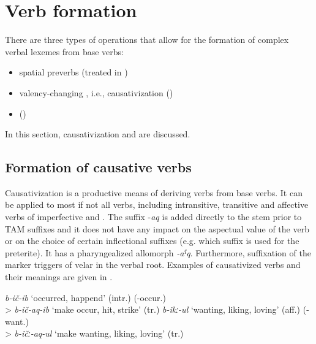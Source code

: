 \chapter{Verb formation}
\label{cpt:verbformation}

There are three types of operations that allow for the formation of complex verbal lexemes from base verbs:

\begin{itemize}
	\item	spatial preverbs (treated in )
	\item	valency-changing , i.e., causativization ()
	\item	{} ()
\end{itemize}

In this section, causativization and  are discussed. 



\section{Formation of causative verbs}
\label{sec:Formation of causative verbs}
Causativization is a productive means of deriving  verbs from base verbs. It can be applied to most if not all verbs, including intransitive, transitive and affective verbs of imperfective and . The  suffix -\textit{aq} is added directly to the stem prior to TAM suffixes and it does not have any impact on the aspectual value of the verb or on the choice of certain inflectional suffixes (e.g. which suffix is used for the preterite). It has a pharyngealized allomorph \textit{-aˁq}. Furthermore, suffixation of the  marker triggers  of velar  in the verbal root. Examples of causativized verbs and their meanings are given in .

\begin{exe}
	\ex	\label{ex:causativizedVerbForms}
	\begin{xlist}
	\ex \textit{b-ič-ib} ‘occurred, happend' (intr.) (-occur.) \\
	> \textit{b-ič-aq-ib} ‘make occur, hit, strike' (tr.)
	\ex \textit{b-ikː-ul} ‘wanting, liking, loving' (aff.) (-want.) \\
	> \textit{b-ičː-aq-ul} ‘make wanting, liking, loving' (tr.)
		\end{xlist}
\end{exe}

